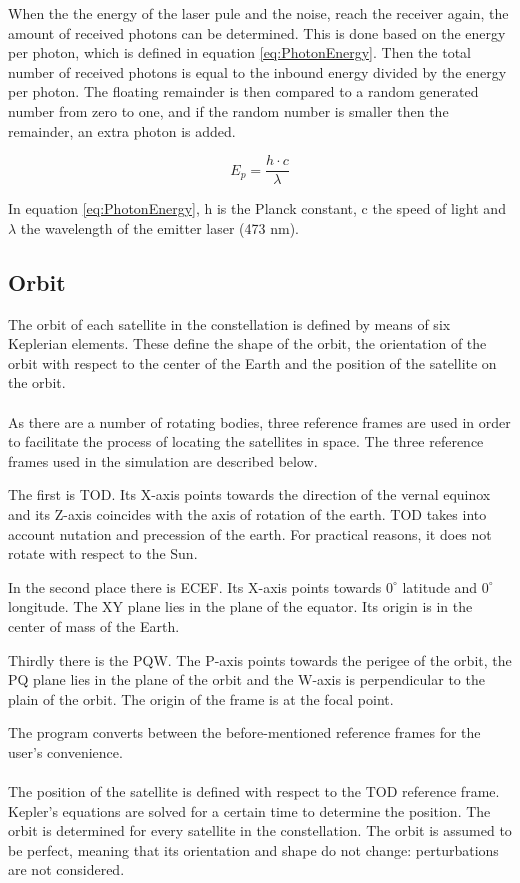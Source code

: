When the the energy of the laser pule and the noise, reach the receiver again, the amount of received photons can be determined. This is done based on the energy per photon, which is defined in equation \ref{eq:PhotonEnergy}. Then the total number of received photons is equal to the inbound energy divided by the energy per photon. The floating remainder is then compared to a random generated number from zero to one, and if the random number is smaller then the remainder, an extra photon is added.

\begin{equation}
	E_{p}=\frac{h \cdot c}{\lambda}
	\label{eq:PhotonEnergy}
\end{equation}

In equation \ref{eq:PhotonEnergy}, h is the Planck constant, c the speed of light and $\lambda$ the wavelength of the emitter laser (473 nm).

\subsection{Orbit}
\label{orbit}
The orbit of each satellite in the constellation is defined by means of six Keplerian elements. These define the shape of the orbit, the orientation of the orbit with respect to the center of the Earth and the position of the satellite on the orbit.\\\\
As there are a number of rotating bodies, three reference frames are used in order to facilitate the process of locating the satellites in space. The three reference frames used in the simulation are described below.

The first is \ac{TOD}. Its X-axis points towards the direction of the vernal equinox and its Z-axis coincides with the axis of rotation of the earth. \ac{TOD} takes into account nutation and precession of the earth. For practical reasons, it does not rotate with respect to the Sun.
 
In the second place there is \ac{ECEF}. Its X-axis points towards $0^\circ$ latitude and $0^\circ$ longitude. The XY plane lies in the plane of the equator. Its origin is in the center of mass of the Earth. 

Thirdly there is the PQW. The P-axis points towards the perigee of the orbit, the PQ plane lies in the plane of the orbit and the W-axis is perpendicular to the plain of the orbit. The origin of the frame is at the focal point. 

The program converts between the before-mentioned reference frames for the user's convenience.\\\\
The position of the satellite is defined with respect to the \acs{TOD} reference frame. Kepler's equations are solved for a certain time to determine the position. The orbit is determined for every satellite in the constellation. The orbit is assumed to be perfect, meaning that its orientation and shape do not change: perturbations are not considered. 

